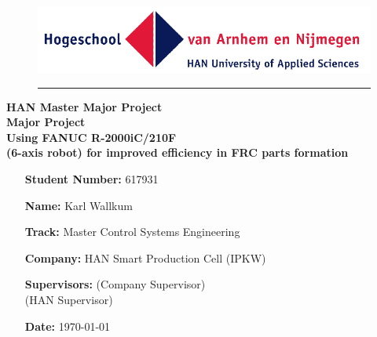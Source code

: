 \begin{titlepage}
	\begin{flushright}
	\begin{minipage}{\linewidth}
		\begin{figure}[H]
			\begin{flushright}
			\includegraphics[width=0.5\linewidth]{Images/HAN}
		\end{flushright}
		\hrule
		\end{figure}
		\begin{flushright}
			\large\textbf{ HAN Master Major Project}\\
			\vspace{20pt}
			\Huge\textbf{Major Project 
			\\
			\vspace{10pt}
			Using FANUC R-2000iC/210F\\
			(6-axis robot) for improved efficiency in FRC parts formation }
		\end{flushright}
		\vspace{35pt}
		\begin{figure}[H]
		\begin{flushleft}
		\end{flushleft}	
		\end{figure}
		\begin{itemize}[leftmargin=4.5cm]
			\LARGE	
			\item[\textbf{Student Number:}] 617931		
			\item[\textbf{Name:}] Karl Wallkum 			
			\item[\textbf{Track:}] Master Control Systems Engineering
			\item[\textbf{Company:}]  HAN Smart Production Cell (IPKW)
			\item[\textbf{Supervisors:}]  \CompanySupervisor (Company Supervisor)\\ \HANSupervisor (HAN Supervisor)			
			\item[\textbf{Date:}] \today		 		
		\end{itemize}
	\end{minipage}
	\end{flushright}

	\begin{flushleft}
	\large \textbf{
		\vspace{40pt}
		\\%
	}


\end{flushleft}
\end{titlepage}
